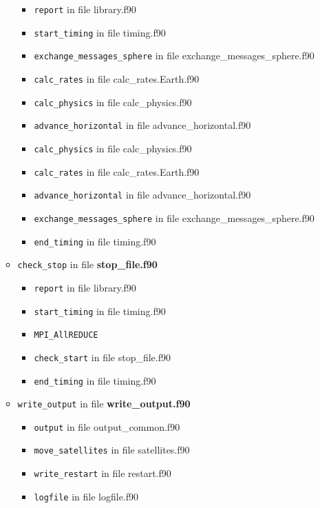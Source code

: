 \begin{itemize}
\begin{itemize}
\begin{itemize}
      \item {\tt report} in file library.f90
      \item {\tt start\_timing} in file timing.f90
      \item {\tt exchange\_messages\_sphere} in file exchange\_messages\_sphere.f90
      \item {\tt calc\_rates} in file calc\_rates.Earth.f90
      \item {\tt calc\_physics} in file calc\_physics.f90
      \item {\tt advance\_horizontal} in file advance\_horizontal.f90
      \item {\tt calc\_physics} in file calc\_physics.f90
      \item {\tt calc\_rates} in file calc\_rates.Earth.f90
      \item {\tt advance\_horizontal} in file advance\_horizontal.f90
      \item {\tt exchange\_messages\_sphere} in file exchange\_messages\_sphere.f90
      \item {\tt end\_timing} in file timing.f90
    \end{itemize}


  \item {\tt check\_stop}   in file {\bf stop\_file.f90}
    \begin{itemize}
      \item {\tt report} in file library.f90
      \item {\tt start\_timing} in file timing.f90
      \item {\tt MPI\_AllREDUCE}
      \item {\tt check\_start} in file stop\_file.f90
      \item {\tt end\_timing} in file timing.f90
    \end{itemize}


  \item {\tt write\_output}   in file {\bf write\_output.f90}
    \begin{itemize}
      \item {\tt output} in file output\_common.f90
      \item {\tt move\_satellites} in file satellites.f90
      \item {\tt write\_restart} in file restart.f90
      \item {\tt logfile} in file logfile.f90
    \end{itemize}


  \end{itemize} %



\end{itemize}
